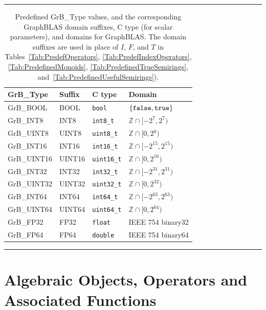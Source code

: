 \begin{table}
\hrule
\begin{center}
\caption{Predefined {\sf GrB\_Type} values, and the corresponding GraphBLAS domain 
suffixes, C type (for scalar parameters), and domains for GraphBLAS.  The domain
suffixes are used in place of $I$, $F$, and $T$ in 
Tables~\ref{Tab:PredefOperators}, \ref{Tab:PredefIndexOperators}, 
\ref{Tab:PredefinedMonoids}, \ref{Tab:PredefinedTrueSemirings}, 
and~\ref{Tab:PredefinedUsefulSemirings}).}
\label{Tab:PredefinedTypes}
\label{Tab:PredefinedDomains}

\vspace{1\baselineskip}
\begin{tabular}{l|l|l|l}
{\sf GrB\_Type}   & Suffix       & C type          & Domain \\
\hline
{\sf GrB\_BOOL}   & {\sf BOOL}   & {\tt bool}      & $\{ {\tt false}, {\tt true} \}$  \\
{\sf GrB\_INT8}   & {\sf INT8}   & {\tt int8\_t}   & $\mathbb{Z} \cap [-2^{7},2^{7})$  \\
{\sf GrB\_UINT8}  & {\sf UINT8}  & {\tt uint8\_t}  & $\mathbb{Z} \cap [0,2{^8})$  \\
{\sf GrB\_INT16}  & {\sf INT16}  & {\tt int16\_t}  & $\mathbb{Z} \cap [-2^{15},2^{15})$ \\
{\sf GrB\_UINT16} & {\sf UINT16} & {\tt uint16\_t} & $\mathbb{Z} \cap [0,2^{16})$ \\
{\sf GrB\_INT32}  & {\sf INT32}  & {\tt int32\_t}  & $\mathbb{Z} \cap [-2^{31},2^{31})$ \\
{\sf GrB\_UINT32} & {\sf UINT32} & {\tt uint32\_t} & $\mathbb{Z} \cap [0,2^{32})$ \\
{\sf GrB\_INT64}  & {\sf INT64}  & {\tt int64\_t}  & $\mathbb{Z} \cap [-2^{63},2^{63})$ \\
{\sf GrB\_UINT64} & {\sf UINT64} & {\tt uint64\_t} & $\mathbb{Z} \cap [0,2^{64})$ \\
{\sf GrB\_FP32}   & {\sf FP32}   & {\tt float}     & IEEE 754 {\sf binary32}  \\
{\sf GrB\_FP64}   & {\sf FP64}   & {\tt double}    & IEEE 754 {\sf binary64}  
\end{tabular}
\end{center}
\hrule
\end{table}

\section{Algebraic Objects, Operators and Associated Functions}

